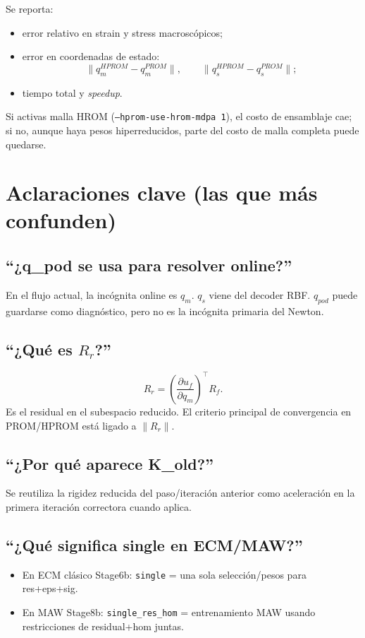 \documentclass[11pt,a4paper]{article}
\begin{document}
Se reporta:
\begin{itemize}[leftmargin=1.5em]
\item error relativo en strain y stress macroscópicos;
\item error en coordenadas de estado:
\[
\|q_m^{HPROM}-q_m^{PROM}\|,\qquad
\|q_s^{HPROM}-q_s^{PROM}\|;
\]
\item tiempo total y \textit{speedup}.
\end{itemize}

Si activas malla HROM (\texttt{--hprom-use-hrom-mdpa 1}), el costo de ensamblaje cae;
si no, aunque haya pesos hiperreducidos, parte del costo de malla completa puede quedarse.

\section{Aclaraciones clave (las que más confunden)}
\subsection{``¿q\_pod se usa para resolver online?''}
En el flujo actual, la incógnita online es $q_m$.
$q_s$ viene del decoder RBF.
$q_{pod}$ puede guardarse como diagnóstico, pero no es la incógnita primaria del Newton.

\subsection{``¿Qué es $R_r$?''}
\[
R_r = \left(\frac{\partial u_f}{\partial q_m}\right)^\top R_f.
\]
Es el residual en el subespacio reducido.
El criterio principal de convergencia en PROM/HPROM está ligado a $\|R_r\|$.

\subsection{``¿Por qué aparece K\_old?''}
Se reutiliza la rigidez reducida del paso/iteración anterior como aceleración en la primera iteración correctora cuando aplica.

\subsection{``¿Qué significa single en ECM/MAW?''}
\begin{itemize}[leftmargin=1.5em]
\item En ECM clásico Stage6b: \texttt{single} = una sola selección/pesos para res+eps+sig.
\item En MAW Stage8b: \texttt{single\_res\_hom} = entrenamiento MAW usando restricciones de residual+hom juntas.
\end{itemize}
\end{document}

